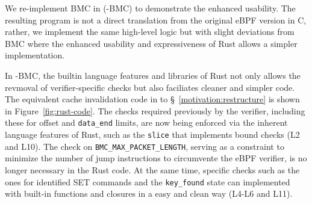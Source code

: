 

We re-implement BMC\cite{BMC} in \projname{} (\projname{}-BMC) to demonstrate the
    enhanced usability.
The resulting program is not a direct translation from the original eBPF
    version in C, rather, we implement the same high-level logic but with
    slight deviations from BMC where the enhanced usability and expressiveness
    of Rust allows a simpler implementation.

In \projname{}-BMC, the builtin language features and libraries of Rust not
    only allows the revmoval of verifier-specific checks but also faciliates
    cleaner and simpler code.
The equivalent cache invalidation code in \projname{} to
    \S~\ref{motivation:restructure} is shown in Figure~\ref{fig:rust-code}.
The checks required previously by the verifier, including these for offset and
    \texttt{data\_end} limits, are now being enforced via the inherent language
    features of Rust, such as the \texttt{slice} that implements bound checks
    (L2 and L10).
The check on \texttt{BMC\_MAX\_PACKET\_LENGTH}, serving as a constraint to minimize the number
    of jump instructions to circumvente the eBPF verifier, is no longer necessary
    in the Rust code.
At the same time, specific checks such as the ones for identified SET commands
    and the \texttt{key\_found} state can implemented with built-in
    functions and closures in a easy and clean way (L4-L6 and L11).



